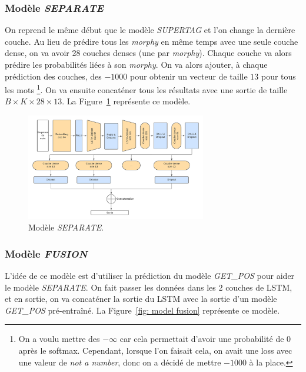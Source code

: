 \documentclass[a4paper]{article}
\begin{document}
\subsubsection{Modèle \textit{SEPARATE}}

On reprend le même début que le modèle \textit{SUPERTAG} et l'on change la dernière couche. Au lieu de prédire tous les 
\textit{morphy} en même temps avec une seule couche dense, on va avoir 28 couches denses (une par \textit{morphy}). Chaque couche
va alors prédire les probabilités liées à son \textit{morphy}. On va alors ajouter, à chaque prédiction des couches, des $- 1000$
pour obtenir un vecteur de taille $13$ pour tous les mots
\footnote{On a voulu mettre des $-\infty$ car cela permettait d'avoir une probabilité de $0$ après le softmax. Cependant, 
lorsque l'on faisait cela, on avait une loss avec une valeur de \textit{not a number}, donc on a décidé de mettre $-1000$ à 
la place.}.
On va ensuite concaténer tous les résultats avec une sortie de 
taille $B \times K \times 28 \times 13$. La Figure~\ref{fig: model separate} représente ce modèle.

\begin{figure}[H]
    \centering
    \includegraphics[width=0.7\textwidth]{get_morphy_separate.png}
    \caption{Modèle \textit{SEPARATE}.}
    \label{fig: model separate}
\end{figure}

\subsubsection{Modèle \textit{FUSION}}

L'idée de ce modèle est d'utiliser la prédiction du modèle \textit{GET\_POS} pour aider le modèle \textit{SEPARATE}.
On fait passer les données dans les 2 couches de LSTM, et en sortie, on va concaténer la sortie du LSTM avec la sortie
d'un modèle \textit{GET\_POS} pré-entraîné.
La Figure~\ref{fig: model fusion} représente ce modèle.
\end{document}

